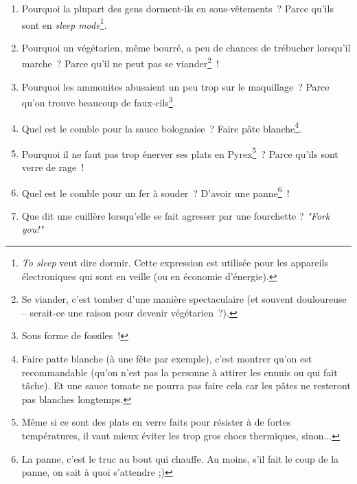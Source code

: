\documentclass[10pt,a5paper,fullpage]{book}
\begin{document}
\begin{enumerate}
		\item Pourquoi la plupart des gens dorment-ils en sous-vêtements~? Parce qu'ils sont en \textit{sleep mode}\footnote{\textit{To sleep} veut dire dormir. Cette expression est utilisée pour les appareils électroniques qui sont en veille (ou en économie d'énergie).}.
		\item Pourquoi un végétarien, même bourré, a peu de chances de trébucher lorsqu'il marche~? Parce qu'il ne peut pas se viander\footnote{Se viander, c'est tomber d'une manière spectaculaire (et souvent douloureuse -- serait-ce une raison pour devenir végétarien~?).}~!
		\item Pourquoi les ammonites abusaient un peu trop sur le maquillage~? Parce qu'on trouve beaucoup de faux-cils\footnote{Sous forme de fossiles~!}.
		\item Quel est le comble pour la sauce bolognaise~? Faire pâte blanche\footnote{Faire patte blanche (à une fête par exemple), c'est montrer qu'on est recommandable (qu'on n'est pas la personne à attirer les ennuis ou qui fait tâche). Et une sauce tomate ne pourra pas faire cela car les pâtes ne resteront pas blanches longtemps.}.
		\item Pourquoi il ne faut pas trop énerver ses plats en Pyrex\footnote{Même si ce sont des plats en verre faits pour résister à de fortes températures, il vaut mieux éviter les trop gros chocs thermiques, sinon...}~? Parce qu'ils sont verre de rage~!
		\item Quel est le comble pour un fer à souder~? D'avoir une panne\footnote{La panne, c'est le truc au bout qui chauffe. Au moins, s'il fait le coup de la panne, on sait à quoi s'attendre ;)}~!
		\item Que dit une cuillère lorsqu'elle se fait agresser par une fourchette ? \textit{"Fork you!"}
	\end{enumerate}
	
\end{document}
